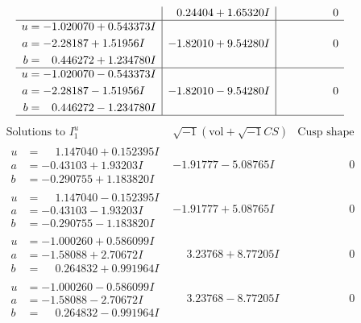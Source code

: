 \documentclass[1p]{elsarticle_modified}
\theoremstyle{definition}
\newcommand{\I}{\sqrt{-1}}
\begin{document}
$$\begin{array}{c|c|c}
 & \phantom{-}0.24404 + 1.65320 I & \phantom{-0.000000 } 0 \\ \hline\begin{aligned}
u &= -1.020070 + 0.543373 I \\
a &= -2.28187 + 1.51956 I \\
b &= \phantom{-}0.446272 + 1.234780 I\end{aligned}
 & -1.82010 + 9.54280 I & \phantom{-0.000000 } 0 \\ \hline\begin{aligned}
u &= -1.020070 - 0.543373 I \\
a &= -2.28187 - 1.51956 I \\
b &= \phantom{-}0.446272 - 1.234780 I\end{aligned}
 & -1.82010 - 9.54280 I & \phantom{-0.000000 } 0\\
 \hline 
 \end{array}$$\newpage$$\begin{array}{c|c|c}  
\text{Solutions to }I^u_{1}& \I (\text{vol} + \sqrt{-1}CS) & \text{Cusp shape}\\
 \hline 
\begin{aligned}
u &= \phantom{-}1.147040 + 0.152395 I \\
a &= -0.43103 + 1.93203 I \\
b &= -0.290755 + 1.183820 I\end{aligned}
 & -1.91777 - 5.08765 I & \phantom{-0.000000 } 0 \\ \hline\begin{aligned}
u &= \phantom{-}1.147040 - 0.152395 I \\
a &= -0.43103 - 1.93203 I \\
b &= -0.290755 - 1.183820 I\end{aligned}
 & -1.91777 + 5.08765 I & \phantom{-0.000000 } 0 \\ \hline\begin{aligned}
u &= -1.000260 + 0.586099 I \\
a &= -1.58088 + 2.70672 I \\
b &= \phantom{-}0.264832 + 0.991964 I\end{aligned}
 & \phantom{-}3.23768 + 8.77205 I & \phantom{-0.000000 } 0 \\ \hline\begin{aligned}
u &= -1.000260 - 0.586099 I \\
a &= -1.58088 - 2.70672 I \\
b &= \phantom{-}0.264832 - 0.991964 I\end{aligned}
 & \phantom{-}3.23768 - 8.77205 I & \phantom{-0.000000 } 0 \\ \hline\begin{aligned}

\end{aligned}
\end{array}$$
\end{document}
